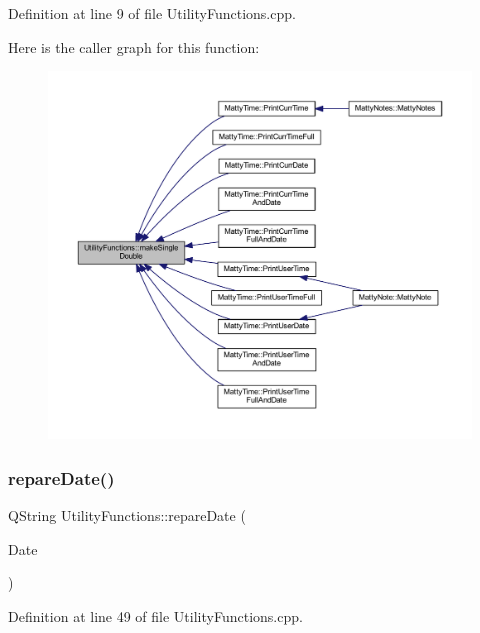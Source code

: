 Definition at line 9 of file Utility\+Functions.\+cpp.

Here is the caller graph for this function\+:
\nopagebreak
\begin{figure}[H]
\begin{center}
\leavevmode
\includegraphics[width=350pt]{classUtilityFunctions_a9decf9e823f96af31a5dac497f2c68d2_icgraph}
\end{center}
\end{figure}
\hypertarget{classUtilityFunctions_a11f16049e57928c6a74aba7438f66841}{}\label{classUtilityFunctions_a11f16049e57928c6a74aba7438f66841} 
\subsubsection{\texorpdfstring{repare\+Date()}{repareDate()}}
{\footnotesize\ttfamily Q\+String Utility\+Functions\+::repare\+Date (\begin{DoxyParamCaption}\item[{Q\+String}]{Date }\end{DoxyParamCaption})\hspace{0.3cm}{\ttfamily [static]}}



Definition at line 49 of file Utility\+Functions.\+cpp.

\hypertarget{classUtilityFunctions_ac2212f463b34781025e9e0bcfeaad3eb}{}\label{classUtilityFunctions_ac2212f463b34781025e9e0bcfeaad3eb} 
